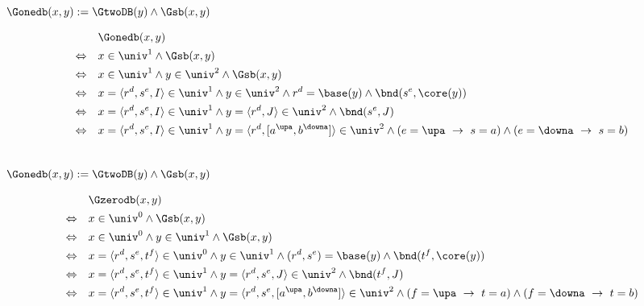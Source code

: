 \begin{erin}\ \\
    $\Gonedb(x,y) := \GtwoDB(y) \wedge \Gsb(x,y)$
\end{erin}

\begin{hyp}
    \begin{align*}
        &\Gonedb(x,y)\\
        \Leftrightarrow \quad &x \in \univ^1 \land \Gsb(x,y)\\
        \Leftrightarrow \quad &x \in \univ^1 \land y \in \univ^2 \land \Gsb(x,y)\\
        \Leftrightarrow \quad &x = \langle r^d, s^e, I \rangle \in \univ^1 \land y \in \univ^2 \land r^d = \base(y) \land \bnd(s^e, \core(y))\\
        \Leftrightarrow \quad &x = \langle r^d, s^e, I \rangle \in \univ^1 \land y = \langle r^d,J \rangle \in \univ^2 \land \bnd(s^e, J)\\
        \Leftrightarrow \quad &x = \langle r^d, s^e, I \rangle \in \univ^1 \land y = \langle r^d,[a^\upa,b^\downa] \rangle \in \univ^2 \land (e = \upa \ \to\ s = a) \land (e = \downa \ \to\ s = b)
    \end{align*}
\end{hyp}


\begin{erin}\ \\
    $\Gonedb(x,y) := \GtwoDB(y) \wedge \Gsb(x,y)$
\end{erin}

\begin{hyp}
    \begin{align*}
        &\Gzerodb(x,y)\\
        \Leftrightarrow \quad &x \in \univ^0 \land \Gsb(x,y)\\
        \Leftrightarrow \quad &x \in \univ^0 \land y \in \univ^1 \land \Gsb(x,y)\\
        \Leftrightarrow \quad &x = \langle r^d, s^e, t^f \rangle \in \univ^0 \land y \in \univ^1 \land (r^d,s^e) = \base(y) \land \bnd(t^f, \core(y))\\
        \Leftrightarrow \quad &x = \langle r^d, s^e, t^f \rangle \in \univ^1 \land y = \langle r^d, s^e, J \rangle \in \univ^2 \land \bnd(t^f,J)\\
        \Leftrightarrow \quad &x = \langle r^d, s^e, t^f \rangle \in \univ^1 \land y = \langle r^d, s^e, [a^\upa,b^\downa] \rangle \in \univ^2 \land (f = \upa \ \to\ t = a) \land (f = \downa \ \to\ t = b)
    \end{align*}
\end{hyp}


